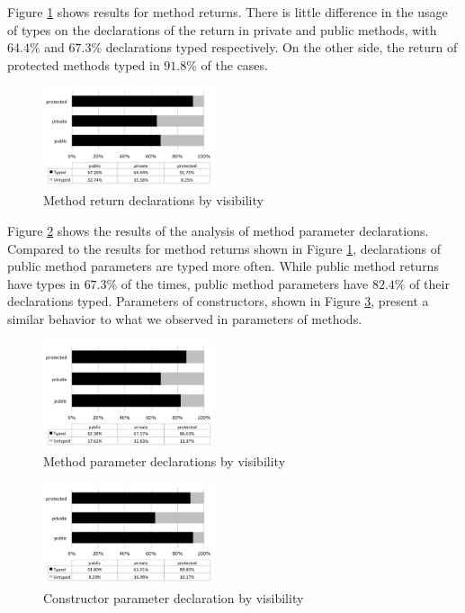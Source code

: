 \documentclass[preprint]{sigplanconf}
\begin{document}
Figure \ref{fig:method_return_visibility} shows results for method returns.
There is little difference in the usage of types on the declarations of the return in private and public methods, with $64.4\%$ and $67.3\%$ declarations typed respectively.
On the other side, the return of protected methods typed in $91.8\%$ of the cases.

\begin{figure}[h]
\centering \includegraphics[width=0.45\textwidth]{method_return_visibility} 
\caption{Method return declarations by visibility}
\label{fig:method_return_visibility} 
\end{figure}

Figure \ref{fig:method_parameter_visibility} shows the results of the analysis of method parameter declarations. 
Compared to the results for method returns shown in Figure \ref{fig:method_return_visibility}, declarations of public method parameters are typed more often.
While public method returns have types in $67.3\%$ of the times, public method parameters have  $82.4\%$ of their declarations typed. 
Parameters of constructors, shown in Figure \ref{fig:constructor_parameter_visibility}, present a similar behavior to what we observed in parameters of methods.

\begin{figure}[h]
\centering \includegraphics[width=0.45\textwidth]{method_parameter_visibility} 
\caption{Method parameter declarations by visibility}
\label{fig:method_parameter_visibility} 
\end{figure}


\begin{figure}[h]
\centering \includegraphics[width=0.45\textwidth]{constructor_parameter_visibility} 
\caption{Constructor parameter declaration by visibility}
\label{fig:constructor_parameter_visibility} 
\end{figure}
\end{document}
